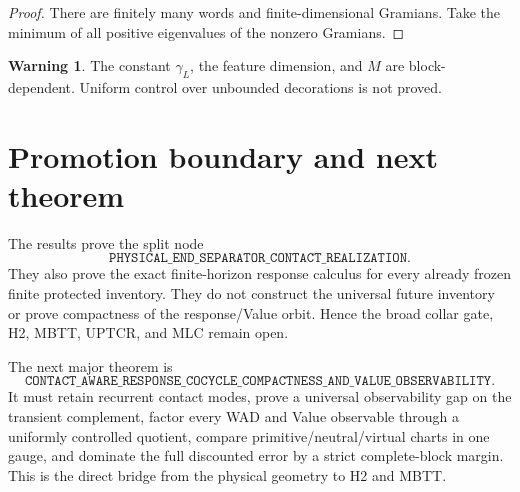 \documentclass[11pt]{article}
\theoremstyle{definition}
\newtheorem{warning}[theorem]{Warning}
\theoremstyle{remark}
\begin{document}
\begin{proof}
There are finitely many words and finite-dimensional Gramians.  Take the
minimum of all positive eigenvalues of the nonzero Gramians.
\end{proof}

\begin{warning}
The constant $\gamma_L$, the feature dimension, and $M$ are block-dependent.
Uniform control over unbounded decorations is not proved.
\end{warning}

\section{Promotion boundary and next theorem}
The results prove the split node
\[
 \boxed{\texttt{PHYSICAL\_END\_SEPARATOR\_CONTACT\_REALIZATION}}.
\]
They also prove the exact finite-horizon response calculus for every already
frozen finite protected inventory.  They do not construct the universal
future inventory or prove compactness of the response/Value orbit.  Hence the
broad collar gate, H2, MBTT, UPTCR, and MLC remain open.

The next major theorem is
\[
\boxed{
\texttt{CONTACT\_AWARE\_RESPONSE\_COCYCLE\_COMPACTNESS\_AND\_VALUE\_OBSERVABILITY}.
}
\]
It must retain recurrent contact modes, prove a universal observability gap on
the transient complement, factor every WAD and Value observable through a
uniformly controlled quotient, compare primitive/neutral/virtual charts in one
gauge, and dominate the full discounted error by a strict complete-block
margin.  This is the direct bridge from the physical geometry to H2 and MBTT.
\end{document}
